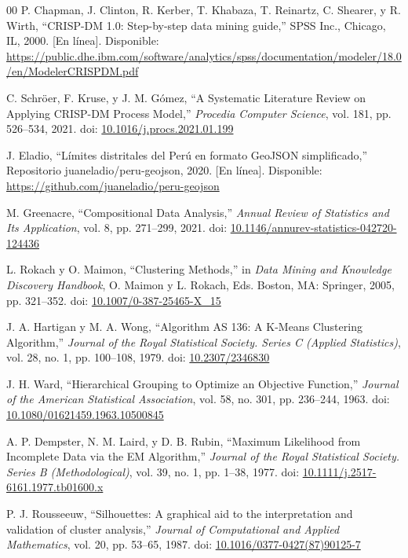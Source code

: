 \documentclass[conference,10pt,letterpaper]{IEEEtran}
\begin{document}
\begin{thebibliography}{00}
 P. Chapman, J. Clinton, R. Kerber, T. Khabaza, T. Reinartz, C. Shearer, y R. Wirth, ``CRISP-DM 1.0: Step-by-step data mining guide,'' SPSS Inc., Chicago, IL, 2000. [En línea]. Disponible: \url{https://public.dhe.ibm.com/software/analytics/spss/documentation/modeler/18.0/en/ModelerCRISPDM.pdf}

 C. Schröer, F. Kruse, y J. M. Gómez, ``A Systematic Literature Review on Applying CRISP-DM Process Model,'' \textit{Procedia Computer Science}, vol. 181, pp. 526--534, 2021. doi: \href{https://doi.org/10.1016/j.procs.2021.01.199}{10.1016/j.procs.2021.01.199}

 J. Eladio, ``Límites distritales del Perú en formato GeoJSON simplificado,'' Repositorio juaneladio/peru-geojson, 2020. [En línea]. Disponible: \url{https://github.com/juaneladio/peru-geojson}

 M. Greenacre, ``Compositional Data Analysis,'' \textit{Annual Review of Statistics and Its Application}, vol. 8, pp. 271--299, 2021. doi: \href{https://doi.org/10.1146/annurev-statistics-042720-124436}{10.1146/annurev-statistics-042720-124436}

 L. Rokach y O. Maimon, ``Clustering Methods,'' in \textit{Data Mining and Knowledge Discovery Handbook}, O. Maimon y L. Rokach, Eds. Boston, MA: Springer, 2005, pp. 321--352. doi: \href{https://doi.org/10.1007/0-387-25465-X_15}{10.1007/0-387-25465-X\_15}

 J. A. Hartigan y M. A. Wong, ``Algorithm AS 136: A K-Means Clustering Algorithm,'' \textit{Journal of the Royal Statistical Society. Series C (Applied Statistics)}, vol. 28, no. 1, pp. 100--108, 1979. doi: \href{https://doi.org/10.2307/2346830}{10.2307/2346830}

 J. H. Ward, ``Hierarchical Grouping to Optimize an Objective Function,'' \textit{Journal of the American Statistical Association}, vol. 58, no. 301, pp. 236--244, 1963. doi: \href{https://doi.org/10.1080/01621459.1963.10500845}{10.1080/01621459.1963.10500845}

 A. P. Dempster, N. M. Laird, y D. B. Rubin, ``Maximum Likelihood from Incomplete Data via the EM Algorithm,'' \textit{Journal of the Royal Statistical Society. Series B (Methodological)}, vol. 39, no. 1, pp. 1--38, 1977. doi: \href{https://doi.org/10.1111/j.2517-6161.1977.tb01600.x}{10.1111/j.2517-6161.1977.tb01600.x}

 P. J. Rousseeuw, ``Silhouettes: A graphical aid to the interpretation and validation of cluster analysis,'' \textit{Journal of Computational and Applied Mathematics}, vol. 20, pp. 53--65, 1987. doi: \href{https://doi.org/10.1016/0377-0427(87)90125-7}{10.1016/0377-0427(87)90125-7}


\end{thebibliography}
\end{document}
